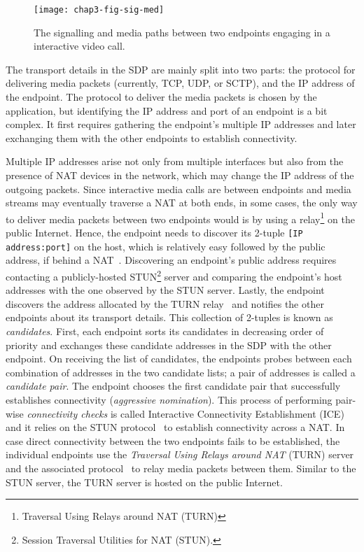 \begin{figure}[!t]
\centerline{\texttt{[image: chap3-fig-sig-med]}}
\caption{The signalling and media paths between two endpoints engaging in
a interactive video call.}
\label{fig:3:sig.media}
\end{figure}


The transport details in the SDP are mainly split into two parts: the protocol
for delivering media packets (currently, TCP, UDP, or SCTP), and the
IP address of the endpoint. The protocol to deliver the media packets is
chosen by the application, but identifying the IP address and port of an
endpoint is a bit complex. It first requires gathering the endpoint's multiple
IP addresses and later exchanging them with the other endpoints to establish
connectivity.

Multiple IP addresses arise not only from multiple interfaces but also from
the presence of NAT devices in the network, which may change the IP address of
the outgoing packets. Since interactive media calls are between endpoints and
media streams may eventually traverse a NAT at both ends, in some cases, the
only way to deliver media packets between two endpoints would is by using
a relay\footnote{Traversal Using Relays around NAT (TURN)} on the public
Internet. Hence, the endpoint needs to discover its 2-tuple \texttt{[IP
address:port]} on the host, which is relatively easy followed by the public
address, if behind a NAT~\cite{rfc5389}. Discovering an endpoint's public address
requires contacting a publicly-hosted STUN\footnote{Session Traversal
Utilities for NAT (STUN).} server and comparing the endpoint's
host addresses with the one observed by the STUN server. Lastly, the endpoint
discovers the address allocated by the TURN relay~\cite{rfc5766} and notifies
the other endpoints about its transport details. This collection of 2-tuples
is known as \emph{candidates}. First, each endpoint sorts its candidates
in decreasing order of priority and exchanges these candidate addresses in the
SDP with the other endpoint. On receiving the list of candidates, the endpoints
probes between each combination of addresses in the two candidate
lists; a pair of addresses is called a \emph{candidate pair}. The endpoint
chooses the first candidate pair that successfully establishes connectivity
(\emph{aggressive nomination}). This process of performing pair-wise
\emph{connectivity checks} is called Interactive Connectivity Establishment
(ICE)~\cite{rfc5245, rfc6544} and it relies on the STUN protocol~\cite{rfc5389} to establish connectivity
across a NAT. In case direct connectivity between the two endpoints fails
to be established, the individual endpoints use the \emph{Traversal Using Relays
around NAT} (TURN) server and the associated protocol~\cite{rfc5766} to relay
media packets between them. Similar to the STUN server, the TURN
server is hosted on the public Internet.

